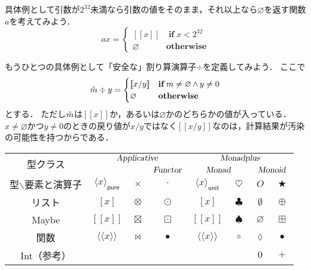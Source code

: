 \documentclass[twocolumn]{jsbook}
\def\[{[\![}
\def\]{]\!]}
\newcommand{\hsklTypeclass}[1]{\textsl{#1}}
\DeclareMathOperator{\hsklApplicativeMap}{\times}
\DeclareMathOperator{\hsklApplicativeListMap}{\otimes}
\DeclareMathOperator{\hsklApplicativeMaybeMap}{\boxtimes}
\DeclareMathOperator{\hsklFmap}{\cdot}
\DeclareMathOperator{\hsklMap}{\odot}
\DeclareMathOperator{\hsklMaybeAppend}{\boxplus}
\DeclareMathOperator{\hsklMaybeMap}{\boxdot}
\DeclareMathOperator{\hsklMonadMap}{\heartsuit}
\newcommand{\hsklAppend}{\oplus}
\newcommand{\hsklApplicative}{\hsklTypeclass{Applicative}}
\newcommand{\hsklEmptyList}{\emptyset}
\newcommand{\hsklFunctor}{\hsklTypeclass{Functor}}
\newcommand{\hsklMonad}{\hsklTypeclass{Monad}}
\newcommand{\hsklMonadplus}{\hsklTypeclass{Monadplus}}
\newcommand{\hsklMonoid}{\hsklTypeclass{Monoid}}
\newcommand{\hsklNothing}{\varnothing}
\newcommand{\hsklJust}[1]{\[#1\]}
\newcommand{\hsklMaybe}[1]{\Tilde{#1}}
\newcommand{\hsklPure}[1]{\langle#1\rangle_\textsf{pure}}
\newcommand{\hsklUnit}[1]{\langle#1\rangle_\textsf{unit}}
\newcommand{\mathKeyword}[1]{\mathbf{#1}}
\DeclareMathOperator{\mathAnyBinaryOperator}{\bigstar}
\DeclareMathOperator{\mathAnd}{\wedge}
\DeclareMathOperator{\mathCompose}{\bullet}
\DeclareMathOperator{\mathIf}{\mathKeyword{if}}
\newcommand{\mathLambdaAnonymousParameter}{\lozenge}
\newcommand{\mathOtherwise}{\mathKeyword{otherwise}}
\begin{document}
具体例として引数が$2^{32}$未満なら引数の値をそのまま，それ以上なら$\hsklNothing$を返す関数$a$を考えてみよう．
\begin{equation*}
ax=\begin{cases}
\hsklJust{x}&\mathIf x<2^{32}\\
\hsklNothing&\mathOtherwise
\end{cases}
\end{equation*}


もうひとつの具体例として「安全な」割り算演算子$\div$を定義してみよう．
ここで
\begin{equation*}
\hsklMaybe{m}\div y=\begin{cases}\hsklJust{x/y}&\mathIf m\neq\hsklNothing\mathAnd y\neq0\\
\hsklNothing&\mathOtherwise\end{cases}
\end{equation*}
とする．
ただし$\hsklMaybe{m}$は$\hsklJust{x}$か，あるいは$\hsklNothing$かのどちらかの値が入っている．
$x\neq\hsklNothing$かつ$y\neq0$のときの戻り値が$x/y$ではなく$\hsklJust{x/y}$なのは，計算結果が汚染の可能性を持つからである．


\begin{table*}
\begin{center}
\begin{tabular}{||c||c|c|c|c|c|c|c||}
\hline
\multirow{2}{*}{型クラス}
    &\multicolumn{3}{|c|}{$\hsklApplicative$}
    &\multicolumn{4}{|c||}{$\hsklMonadplus$}\\
\cline{4-8}
\multirow{1}{*}{}
    &\multicolumn{2}{|c|}{ }
    &$\hsklFunctor$
    &\multicolumn{2}{|c}{$\hsklMonad$}
    &\multicolumn{2}{|c||}{$\hsklMonoid$}\\
\hline\hline
型$\backslash$要素と演算子
    &$\hsklPure{x}$
    &$\hsklApplicativeMap$
    &$\hsklFmap$
    &$\hsklUnit{x}$
    &$\hsklMonadMap$
    &$O$
    &$\mathAnyBinaryOperator$\\
\hline
リスト
    &$[x]$
    &$\hsklApplicativeListMap$
    &$\hsklMap$
    &$[x]$
    &$\clubsuit$
    &$\hsklEmptyList$
    &$\hsklAppend$\\
\hline
Maybe
    &$\hsklJust{x}$
    &$\hsklApplicativeMaybeMap$
    &$\hsklMaybeMap$
    &$\hsklJust{x}$
    &$\spadesuit$
    &$\hsklNothing$
    &$\hsklMaybeAppend$\\
\hline
関数
    &$\langle\!\langle x\rangle\!\rangle$
    &$\bowtie$
    &$\mathCompose$
    &$\langle\!\langle x\rangle\!\rangle$
    &$\circ$
    &$\mathLambdaAnonymousParameter$
    &$\mathCompose$\\
\hline
Int（参考）
    &
    &
    &
    &
    &
    &$0$
    &$+$\\
\hline
\end{tabular}
\end{center}
\end{table*}
\end{document}
